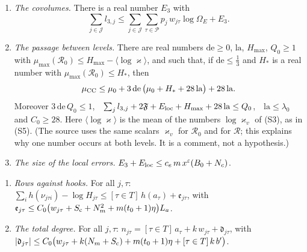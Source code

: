 \documentclass[11pt,letterpaper]{article}
\begin{document}
\begin{enumerate}[label=\textup{(S\arabic*)},leftmargin=2.8em,itemsep=3pt,topsep=3pt]
\begin{equation}
 \mu_0-\langle\log\varkappa\rangle\le\sum_{j\in\mathcal J}l_{3,j}+2\mathfrak F+E_{\rm loc}.
\end{equation}
Here $l_{3,j}$ is an upper bound for the normalised logarithmic covolume, divided by $\dim Y$, of the
lattice attached to the $j$th lift; $\mathfrak F$ is the sum of the local index terms; $E_{\rm loc}$ is
the sum of the local errors. This is the form of the source: its theorem has the bound by $l_{3,j}$ among
its hypotheses and the display as its conclusion (subsection 5).
\item \emph{The covolumes.} There is a real number $E_3$ with
\begin{equation}\label{D:258}
 \sum_{j\in\mathcal J}l_{3,j}\le\sum_{j\in\mathcal J}\sum_{\tau\in\mathcal P}p_j\,w_{j\tau}\log\Omega_E+E_3 .
\end{equation}
\item \emph{The passage between levels.} There are real numbers $\mathrm{de}\ge0$, $\mathrm{la}$, $H_{\max}$, $Q_0\ge1$ with
$\mu_{\max}(\mathcal R_0)\le H_{\max}-\langle\log\varkappa\rangle$, and such that, if
$\mathrm{de}\le\frac13$ and $H_*$ is a real number with $\mu_{\max}(\mathcal R_0)\le H_*$, then
\begin{equation}\label{D:259}
 \mu_{\rm CC}\le\mu_0+3\,\mathrm{de}\,\big(\mu_0+H_*+28\,\mathrm{la}\big)+28\,\mathrm{la} .
\end{equation}
Moreover $3\,\mathrm{de}\,Q_0\le1$,\ \
$\sum_jl_{3,j}+2\mathfrak F+E_{\rm loc}+H_{\max}+28\,\mathrm{la}\le Q_0$,\ \
$\mathrm{la}\le\lambda_0$ and $C_0\ge28$. Here $\langle\log\varkappa\rangle$ is the mean of the numbers
$\log\varkappa_v$ of (S3), as in (S5). (The source uses the same scalars $\varkappa_v$ for $\mathcal R_0$
and for $\mathcal R$; this explains why one number occurs at both levels. It is a comment, not a
hypothesis.)
\item \emph{The size of the local errors.} $E_3+E_{\rm loc}\le c_e\,m\,x^{\varepsilon}(B_0+N_c)$.
\end{enumerate}
\begin{enumerate}[label=\textup{(W\arabic*)},leftmargin=2.8em,itemsep=3pt,topsep=3pt]
\item \emph{Rows against hooks.} For all $j,\tau$:\quad
$\sum_ih(\nu_{j\tau i})-\log H_{j\tau}\le[\tau\in T]\,h(a_\tau)+\mathfrak e_{j\tau}$, with
$\mathfrak e_{j\tau}\le C_0\big(w_{j\tau}+S_{\rm c}+N_m^2+m(t_0+1)\eta\big)L_a$.
\item \emph{The total degree.} For all $j,\tau$:\quad
$n_{j\tau}=[\tau\in T]\,a_\tau+k\,w_{j\tau}+\mathfrak d_{j\tau}$, with
$|\mathfrak d_{j\tau}|\le C_0\big(w_{j\tau}+k(N_m+S_{\rm c})+m(t_0+1)\eta+[\tau\in T]\,k\,b'\big)$.
\end{enumerate}
\end{document}
